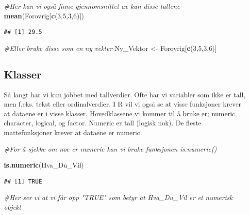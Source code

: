 \documentclass[
]{article}
\newenvironment{Shaded}{\begin{snugshade}}{\end{snugshade}}
\newcommand{\CommentTok}[1]{\textcolor[rgb]{0.56,0.35,0.01}{\textit{#1}}}
\newcommand{\DecValTok}[1]{\textcolor[rgb]{0.00,0.00,0.81}{#1}}
\newcommand{\KeywordTok}[1]{\textcolor[rgb]{0.13,0.29,0.53}{\textbf{#1}}}
\newcommand{\NormalTok}[1]{#1}
\newcommand{\StringTok}[1]{\textcolor[rgb]{0.31,0.60,0.02}{#1}}
\begin{document}
\begin{Shaded}
\begin{Highlighting}[]
\CommentTok{#Her kan vi også finne gjennomsnittet av kun disse tallene}
\KeywordTok{mean}\NormalTok{(Forovrig[}\KeywordTok{c}\NormalTok{(}\DecValTok{3}\NormalTok{,}\DecValTok{5}\NormalTok{,}\DecValTok{3}\NormalTok{,}\DecValTok{6}\NormalTok{)])}
\end{Highlighting}
\end{Shaded}

\begin{verbatim}
## [1] 29.5
\end{verbatim}

\begin{Shaded}
\begin{Highlighting}[]
\CommentTok{#Eller bruke disse som en ny vekter}
\NormalTok{Ny_Vektor <-}\StringTok{ }\NormalTok{Forovrig[}\KeywordTok{c}\NormalTok{(}\DecValTok{3}\NormalTok{,}\DecValTok{5}\NormalTok{,}\DecValTok{3}\NormalTok{,}\DecValTok{6}\NormalTok{)]}
\end{Highlighting}
\end{Shaded}

\hypertarget{klasser}{%
\subsection{Klasser}\label{klasser}}

Så langt har vi kun jobbet med tallverdier. Ofte har vi variabler som
ikke er tall, men f.eks. tekst eller ordinalverdier. I R vil vi også se
at visse funksjoner krever at dataene er i visse klasser. Hovedklassene
vi kommer til å bruke er; numeric, character, logical, og factor.
Numeric er tall (logisk nok). De fleste mattefunksjoner krever at
dataene er numeric.

\begin{Shaded}
\begin{Highlighting}[]
\CommentTok{#For å sjekke om noe er numeric kan vi bruke funksjonen is.numeric()}

\KeywordTok{is.numeric}\NormalTok{(Hva_Du_Vil)}
\end{Highlighting}
\end{Shaded}

\begin{verbatim}
## [1] TRUE
\end{verbatim}

\begin{Shaded}
\begin{Highlighting}[]
\CommentTok{#Her ser vi at vi får opp "TRUE" som betyr at Hva_Du_Vil er et numerisk objekt}
\end{Highlighting}
\end{Shaded}
\end{document}
